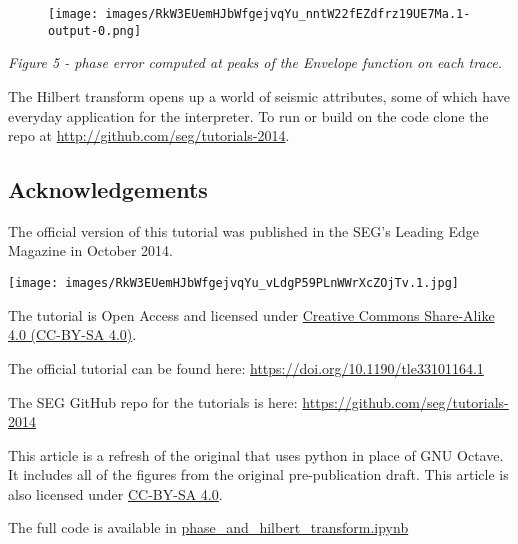   \begin{figure}[ht]
    \centering
    \texttt{[image: images/RkW3EUemHJbWfgejvqYu\_nntW22fEZdfrz19UE7Ma.1-output-0.png]}
  \end{figure}


\textit{Figure 5 - phase error computed at peaks of the Envelope function on each trace.}

The Hilbert transform opens up a world of seismic attributes, some of which have everyday application for the interpreter. To run or build on the code clone the repo at \url{http://github.com/seg/tutorials-2014}.

\subsection*{Acknowledgements}

The official version of this tutorial was published in the SEG’s Leading Edge Magazine in October 2014.


\begin{center}
  \texttt{[image: images/RkW3EUemHJbWfgejvqYu\_vLdgP59PLnWWrXcZOjTv.1.jpg]}
\end{center}
The tutorial is Open Access and licensed under \href{https://creativecommons.org/licenses/by-sa/4.0/}{Creative Commons Share-Alike 4.0 (CC-BY-SA 4.0)}.

\begin{callout}
  The official tutorial can be found here: \url{https://doi.org/10.1190/tle33101164.1}

  The SEG GitHub repo for the tutorials is here: \url{https://github.com/seg/tutorials-2014}
\end{callout}

This article is a refresh of the original that uses python in place of GNU Octave. It includes all of the figures from the original pre-publication draft. This article is also licensed under \href{https://creativecommons.org/licenses/by-sa/4.0/}{CC-BY-SA 4.0}.

The full code is available in \href{https://curvenote.com/blocks/RkW3EUemHJbWfgejvqYu/mNnJgVOim6kyzo1p5ipL}{phase\_and\_hilbert\_transform.ipynb}

